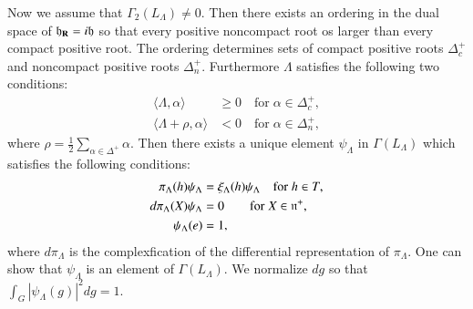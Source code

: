  Now we assume that $\Gamma_{2}(L_{\Lambda}) \neq 0$. Then there exists an ordering in the dual space of $\mathfrak{h}_{\mathbf{R}} = i\mathfrak{h}$ so that every positive noncompact root os larger than every compact positive root. The ordering determines sets of compact positive roots $\Delta_{c}^{+}$ and noncompact positive roots $\Delta_{n}^{+}$. Furthermore $\Lambda$ satisfies the following two conditions: 
 \begin{align*}
\langle \Lambda, \alpha \rangle &\geq 0 \quad \text{for}\; \alpha \in \Delta_{c}^{+},\\
\langle \Lambda+ \rho, \alpha \rangle &< 0 \quad \text{for}\; \alpha \in \Delta_{n}^{+},
 \end{align*}
where $\rho = \frac{1}{2}\sum_{\alpha \in \Delta^{+}}\alpha$. Then there exists a unique element $\psi_{\Lambda}$ in $\Gamma(L_{\Lambda})$ which satisfies the following conditions:
\begin{align*}
\pi_{\Lambda}(h)\psi_{\Lambda} &= \xi_{\Lambda}(h)\psi_{\Lambda} \quad \text{for}\; h\in T,\\
d\pi_{\Lambda}(X)\psi_{\Lambda} &= 0 \qquad \text{for}\; X \in \mathfrak{n}^{+},\\
\psi_{\Lambda}(e) &=1, 
\end{align*}
where $d\pi_{\Lambda}$ is the complexfication of the differential representation of $\pi_{\Lambda}$. One can show that $\psi_{\Lambda}$ is an element of $\Gamma(L_{\Lambda})$. We normalize $dg$ so that $\int_{G}|\psi_{\Lambda}(g)|^{2}dg=1$.

